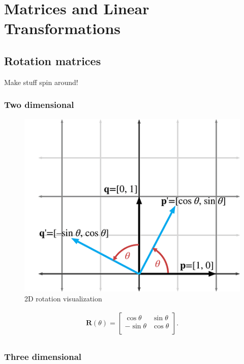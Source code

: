 \documentclass[a4paper,11pt]{article}
\begin{document}
\newpage	
\section{Matrices and Linear Transformations}

\subsection{Rotation matrices}\label{sec:rotation-matrices}

Make stuff spin around!

\subsubsection{Two dimensional}

\begin{figure}[H]
\centering
    \includegraphics{05_2d_rotation}
\caption{2D rotation visualization}
\label{fig:2d-rotation-visualization}
\end{figure}

$$
\begin{matrix}
{\mathbf{R}(\theta) =
\begin{bmatrix}
{\cos\theta} & {\sin\theta} \\
{- \sin\theta} & {\cos\theta} \\
\end{bmatrix}.} \\
\end{matrix}
$$

\subsubsection{Three dimensional}
\end{document}
